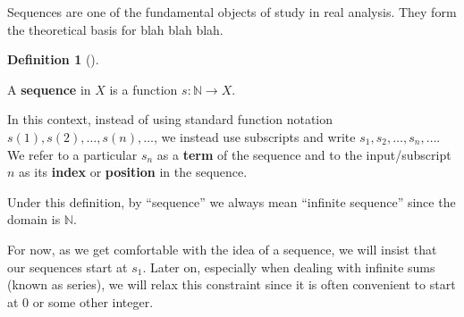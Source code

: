 \documentclass[
  letterpaper,
  DIV=11,
  numbers=noendperiod]{scrreprt}
\def\N{\mathbb N}
\theoremstyle{plain}
\theoremstyle{definition}
\theoremstyle{plain}
\theoremstyle{plain}
\theoremstyle{definition}
\theoremstyle{definition}
\newtheorem{definition}{Definition}[chapter]
\theoremstyle{remark}
\begin{document}
Sequences are one of the fundamental objects of study in real analysis.
They form the theoretical basis for blah blah blah.

\begin{definition}[]\protect\hypertarget{def-sequence}{}\label{def-sequence}

A \textbf{sequence} in \(X\) is a function \(s:\N\rightarrow X\).

\end{definition}

In this context, instead of using standard function notation
\(s(1),s(2),\ldots,s(n),\ldots\), we instead use subscripts and write
\(s_1,s_2,\ldots,s_n,\ldots\). We refer to a particular \(s_n\) as a
\textbf{term} of the sequence and to the input/subscript \(n\) as its
\textbf{index} or \textbf{position} in the sequence.

\begin{tcolorbox}[enhanced jigsaw, titlerule=0mm, opacitybacktitle=0.6, leftrule=.75mm, bottomrule=.15mm, left=2mm, arc=.35mm, colback=white, rightrule=.15mm, colframe=quarto-callout-caution-color-frame, toptitle=1mm, breakable, opacityback=0, colbacktitle=quarto-callout-caution-color!10!white, bottomtitle=1mm, title=\textcolor{quarto-callout-caution-color}{\faFire}\hspace{0.5em}{Caution}, coltitle=black, toprule=.15mm]

Under this definition, by ``sequence'' we always mean ``infinite
sequence'' since the domain is \(\N\).

\end{tcolorbox}

\begin{tcolorbox}[enhanced jigsaw, titlerule=0mm, opacitybacktitle=0.6, leftrule=.75mm, bottomrule=.15mm, left=2mm, arc=.35mm, colback=white, rightrule=.15mm, colframe=quarto-callout-note-color-frame, toptitle=1mm, breakable, opacityback=0, colbacktitle=quarto-callout-note-color!10!white, bottomtitle=1mm, title=\textcolor{quarto-callout-note-color}{\faInfo}\hspace{0.5em}{Note}, coltitle=black, toprule=.15mm]

For now, as we get comfortable with the idea of a sequence, we will
insist that our sequences start at \(s_1\). Later on, especially when
dealing with infinite sums (known as series), we will relax this
constraint since it is often convenient to start at \(0\) or some other
integer.

\end{tcolorbox}
\end{document}
